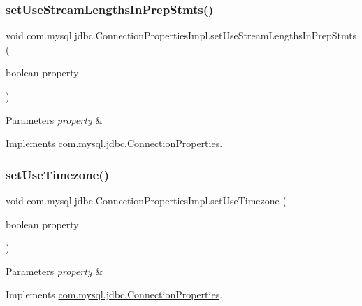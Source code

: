 \subsubsection{\texorpdfstring{set\+Use\+Stream\+Lengths\+In\+Prep\+Stmts()}{setUseStreamLengthsInPrepStmts()}}
{\footnotesize\ttfamily void com.\+mysql.\+jdbc.\+Connection\+Properties\+Impl.\+set\+Use\+Stream\+Lengths\+In\+Prep\+Stmts (\begin{DoxyParamCaption}\item[{boolean}]{property }\end{DoxyParamCaption})}


\begin{DoxyParams}{Parameters}
{\em property} & \\
\hline
\end{DoxyParams}


Implements \mbox{\hyperlink{interfacecom_1_1mysql_1_1jdbc_1_1_connection_properties_a34c1ecb9d6258a0289516696cf8537be}{com.\+mysql.\+jdbc.\+Connection\+Properties}}.

\mbox{\label{classcom_1_1mysql_1_1jdbc_1_1_connection_properties_impl_ad035c0773944baefb17d901bc0915c81}} 
\subsubsection{\texorpdfstring{set\+Use\+Timezone()}{setUseTimezone()}}
{\footnotesize\ttfamily void com.\+mysql.\+jdbc.\+Connection\+Properties\+Impl.\+set\+Use\+Timezone (\begin{DoxyParamCaption}\item[{boolean}]{property }\end{DoxyParamCaption})}


\begin{DoxyParams}{Parameters}
{\em property} & \\
\hline
\end{DoxyParams}


Implements \mbox{\hyperlink{interfacecom_1_1mysql_1_1jdbc_1_1_connection_properties_a7f57a800fefe86a58c1ddfe7fd7d8ef2}{com.\+mysql.\+jdbc.\+Connection\+Properties}}.

